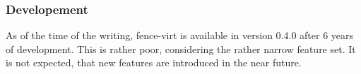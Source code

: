 \subsubsection{Developement}
As of the time of the writing, fence-virt is available in version 0.4.0 after
6 years of development. This is rather poor, considering the rather narrow feature
set. It is not expected, that new features are introduced in the near future.
